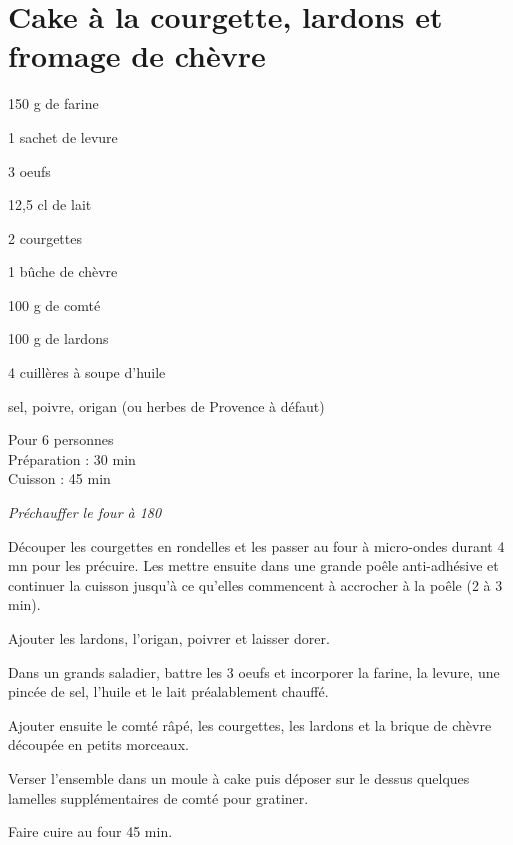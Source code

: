 \begin{minipage}[adjusting]{\textwidth}

\section[\normalsize{Cake \`a la courgette, lardons et fromage de ch\`evre}]{Cake \`a la courgette, lardons et fromage de ch\`evre}

\begin{ingredients}
150 g de farine \par
1 sachet de levure \par
3 oeufs \par
12,5 cl de lait \par
2 courgettes \par
1 bûche de ch\`evre \par
100 g de comt\'e \par
100 g de lardons \par
4 cuill\`eres \`a soupe d'huile \par
sel, poivre, origan (ou herbes de Provence \`a d\'efaut)
\end{ingredients}
\begin{infos}
Pour 6 personnes \\
Préparation : 30 min \\
Cuisson : 45 min \\
\end{infos}

\centering\textit{Préchauffer le four à 180}

\begin{etapes}
\item D\'ecouper les courgettes en rondelles et les passer au four \`a micro-ondes durant 4 mn pour les pr\'ecuire. Les mettre ensuite dans une grande po\^ele anti-adh\'esive et continuer la cuisson jusqu'\`a ce qu'elles commencent \`a accrocher \`a la po\^ele (2 \`a 3 min). 
\item Ajouter les lardons, l'origan, poivrer et laisser dorer.
\item Dans un grands saladier, battre les 3 oeufs et incorporer la farine, la levure, une pinc\'ee de sel, l'huile et le lait pr\'ealablement chauff\'e.
\item Ajouter ensuite le comt\'e r\^ap\'e, les courgettes, les lardons et la brique de ch\`evre d\'ecoup\'ee en petits morceaux. 
\item Verser l'ensemble dans un moule \`a cake puis d\'eposer sur le dessus quelques lamelles suppl\'ementaires de comt\'e pour gratiner.
\item Faire cuire au four 45 min.
\end{etapes}
\begin{conseils}
\end{conseils}


\end{minipage} 
